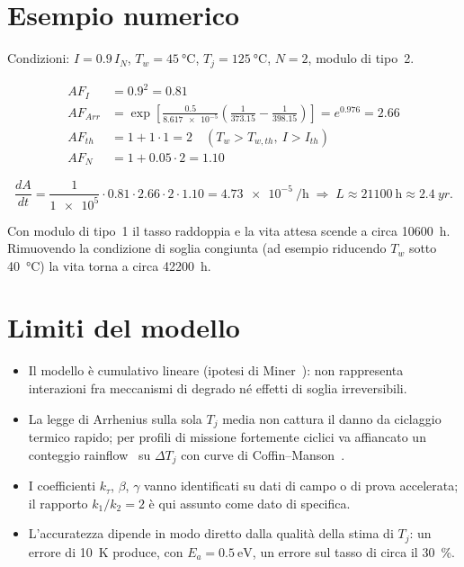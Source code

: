 \documentclass[11pt,a4paper]{article}
\begin{document}
\section{Esempio numerico}

Condizioni: $I = 0.9\,I_N$, $T_w = \SI{45}{\degreeCelsius}$,
$T_j = \SI{125}{\degreeCelsius}$, $N = 2$, modulo di tipo~2.

\begin{align}
  AF_I    &= 0.9^{2} = 0.81 \\
  AF_{Arr}&= \exp\!\left[\frac{0.5}{\num{8.617e-5}}
             \left(\frac{1}{373.15}-\frac{1}{398.15}\right)\right]
             = e^{0.976} = 2.66 \\
  AF_{th} &= 1 + 1\cdot 1 = 2 \quad (T_w > T_{w,th},\ I > I_{th}) \\
  AF_N    &= 1 + 0.05\cdot 2 = 1.10
\end{align}

\begin{equation}
  \frac{dA}{dt} = \frac{1}{\num{1e5}}\cdot 0.81\cdot 2.66\cdot 2\cdot 1.10
  = \SI{4.73e-5}{\per\hour}
  \;\Rightarrow\;
  L \approx \SI{21100}{\hour} \approx \SI{2.4}{yr}.
\end{equation}

Con modulo di tipo~1 il tasso raddoppia e la vita attesa scende a circa
\SI{10600}{\hour}. Rimuovendo la condizione di soglia congiunta (ad esempio
riducendo $T_w$ sotto \SI{40}{\degreeCelsius}) la vita torna a circa
\SI{42200}{\hour}.

\section{Limiti del modello}

\begin{itemize}
  \item Il modello è cumulativo lineare (ipotesi di Miner~\cite{miner1945}):
        non rappresenta interazioni fra meccanismi di degrado né effetti di
        soglia irreversibili.
  \item La legge di Arrhenius sulla sola $T_j$ media non cattura il danno da
        ciclaggio termico rapido; per profili di missione fortemente ciclici va
        affiancato un conteggio rainflow~\cite{downing1982,astm1049} su
        $\Delta T_j$ con curve di Coffin--Manson~\cite{coffin1954,manson1953}.
  \item I coefficienti $k_\tau$, $\beta$, $\gamma$ vanno identificati su dati di
        campo o di prova accelerata; il rapporto $k_1/k_2 = 2$ è qui assunto
        come dato di specifica.
  \item L'accuratezza dipende in modo diretto dalla qualità della stima di
        $T_j$: un errore di \SI{10}{\kelvin} produce, con
        $E_a = \SI{0.5}{\electronvolt}$, un errore sul tasso di circa il
        \SI{30}{\percent}.
\end{itemize}
\end{document}
